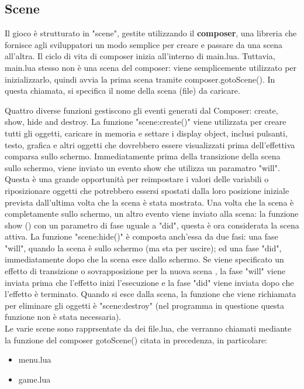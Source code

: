 \documentclass[12pt]{article}
\begin{document}
\subsection{Scene}
Il gioco è strutturato in "scene", gestite utilizzando il \textbf{composer}, una libreria che fornisce agli sviluppatori  un modo semplice per creare e passare da una scena all'altra. Il ciclo di vita di composer inizia all'interno di main.lua. Tuttavia, main.lua stesso non è una scena del composer: viene semplicemente utilizzato per inizializzarlo, quindi avvia la prima scena tramite composer.gotoScene(). In questa chiamata, si specifica il nome della scena (file) da caricare. 

Quattro diverse funzioni gestiscono gli eventi generati dal Composer: create, show, hide and destroy.
La funzione "scene:create()" viene utilizzata per creare tutti gli oggetti, caricare in memoria e settare i display object, inclusi pulsanti, testo, grafica e altri oggetti che dovrebbero essere visualizzati prima dell'effettiva comparsa sullo schermo.
Immediatamente prima della transizione della scena sullo schermo, viene inviato un evento show che utilizza un paramatro "will". Questa è una grande opportunità per reimpostare i valori delle variabili o riposizionare oggetti che potrebbero essersi spostati dalla loro posizione iniziale prevista dall'ultima volta che la scena è stata mostrata. Una volta che la scena è completamente sullo schermo, un altro evento viene inviato alla scena: la funzione show () con un parametro di fase uguale a "did", questa è ora considerata la scena attiva.
La funzione "scene:hide()" è composta anch'essa da due fasi: una fase "will", quando la scena è sullo schermo (ma sta per uscire); ed una fase "did", immediatamente dopo che la scena esce dallo schermo. Se viene specificato un effetto di transizione o sovrapposizione per la nuova scena , la fase "will" viene inviata prima che l'effetto inizi l'esecuzione e la fase "did" viene inviata dopo che l'effetto è terminato.
Quando si esce dalla scena, la funzione che viene richiamata per eliminare gli oggetti è "scene:destroy" (nel programma in questione questa funzione non è stata necessaria). 
\\


Le varie scene sono rapprsentate da dei file.lua, che verranno chiamati mediante la funzione del composer gotoScene() citata in precedenza, in particolare:
\begin{itemize}
    \item menu.lua
    \item game.lua
\end{itemize}
\end{document}
